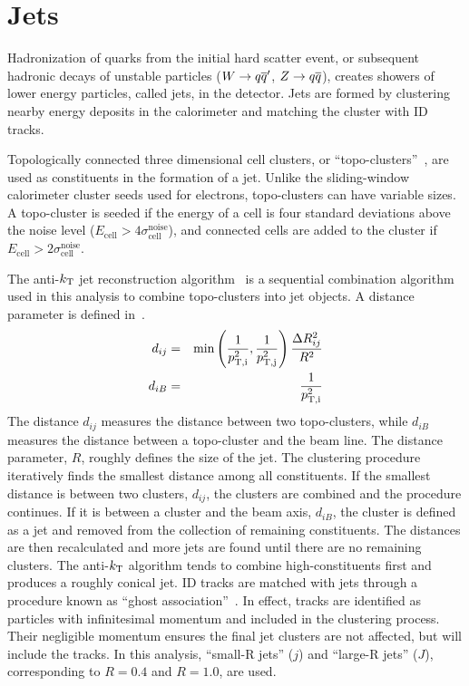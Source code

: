 %
\section{Jets}
Hadronization of quarks from the initial hard scatter event, or subsequent hadronic decays of unstable particles ($W\rightarrow q\overline{q}'$, $Z\rightarrow q\overline{q}$), creates showers of lower energy particles, called jets, in the detector. Jets are formed by clustering nearby energy deposits in the calorimeter and matching the cluster with ID tracks. 

Topologically connected three dimensional cell clusters, or ``topo-clusters''~\cite{topo_cluster}, are used as constituents in the formation of a jet. Unlike the sliding-window calorimeter cluster seeds used for electrons, topo-clusters can have variable sizes. A topo-cluster is seeded if the energy of a cell is four standard deviations above the noise level ($E_{\textrm{cell}}>4 \sigma_{\textrm{cell}}^{\textrm{noise}}$), and connected cells are added to the cluster if $E_{\textrm{cell}}>2 \sigma_{\textrm{cell}}^{\textrm{noise}}$. 

The anti-$k_{\rm T}$ jet reconstruction algorithm~\cite{anti_kt_algo} is a sequential combination algorithm used in this analysis to combine topo-clusters into jet objects. A distance parameter is defined in~\Eqn{\ref{eq:anti_kt}}.
\begin{eqnarray}
\label{eq:anti_kt}
d_{ij} &=& \textrm{min}\left(\frac{1}{p_{\rm T,i}^2},\frac{1}{p_{\rm T,j}^2}\right)\frac{\Delta R_{ij}^2}{R^2}  \\
d_{iB} &=& \frac{1}{p_{\rm T,i}^2} 
\end{eqnarray}
The distance $d_{ij}$ measures the distance between two topo-clusters, while $d_{iB}$ measures the distance between a topo-cluster and the beam line. The distance parameter, $R$, roughly defines the size of the jet. The clustering procedure iteratively finds the smallest distance among all constituents. If the smallest distance is between two clusters, $d_{ij}$, the clusters are combined and the procedure continues. If it is between a cluster and the beam axis, $d_{iB}$, the cluster is defined as a jet and removed from the collection of remaining constituents. The distances are then recalculated and more jets are found until there are no remaining clusters. The anti-$k_{\rm T}$ algorithm tends to combine high-\pT constituents first and produces a roughly conical jet. ID tracks are matched with jets through a procedure known as ``ghost association''~\cite{ghost_assoc}. In effect, tracks are identified as particles with infinitesimal momentum and included in the clustering process. Their negligible momentum ensures the final jet clusters are not affected, but will include the tracks. In this analysis, ``small-R jets'' ($j$) and ``large-R jets'' ($J$), corresponding to $R=0.4$ and $R=1.0$, are used.

